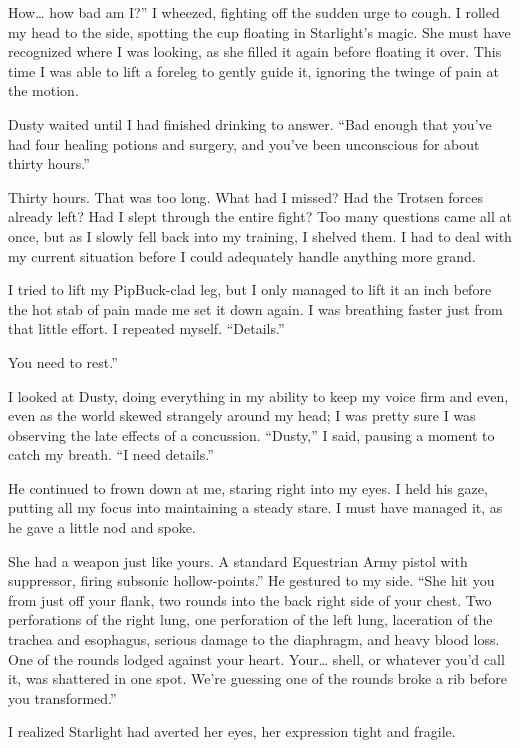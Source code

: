 \leavevmode{}How… how bad am I?” I wheezed, fighting off the sudden urge to cough. I rolled my head to the side, spotting the cup floating in Starlight’s magic. She must have recognized where I was looking, as she filled it again before floating it over. This time I was able to lift a foreleg to gently guide it, ignoring the twinge of pain at the motion.

Dusty waited until I had finished drinking to answer. “Bad enough that you’ve had four healing potions and surgery, and you’ve been unconscious for about thirty hours.”

Thirty hours. That was too long. What had I missed? Had the Trotsen forces already left? Had I slept through the entire fight? Too many questions came all at once, but as I slowly fell back into my training, I shelved them. I had to deal with my current situation before I could adequately handle anything more grand.

I tried to lift my PipBuck-clad leg, but I only managed to lift it an inch before the hot stab of pain made me set it down again. I was breathing faster just from that little effort. I repeated myself. “Details.”

\leavevmode{}You need to rest.”

I looked at Dusty, doing everything in my ability to keep my voice firm and even, even as the world skewed strangely around my head; I was pretty sure I was observing the late effects of a concussion. “Dusty,” I said, pausing a moment to catch my breath. “I need details.”

He continued to frown down at me, staring right into my eyes. I held his gaze, putting all my focus into maintaining a steady stare. I must have managed it, as he gave a little nod and spoke.

\leavevmode{}She had a weapon just like yours. A standard Equestrian Army pistol with suppressor, firing subsonic hollow-points.” He gestured to my side. “She hit you from just off your flank, two rounds into the back right side of your chest. Two perforations of the right lung, one perforation of the left lung, laceration of the trachea and esophagus, serious damage to the diaphragm, and heavy blood loss. One of the rounds lodged against your heart. Your… shell, or whatever you’d call it, was shattered in one spot. We’re guessing one of the rounds broke a rib before you transformed.”

I realized Starlight had averted her eyes, her expression tight and fragile.

